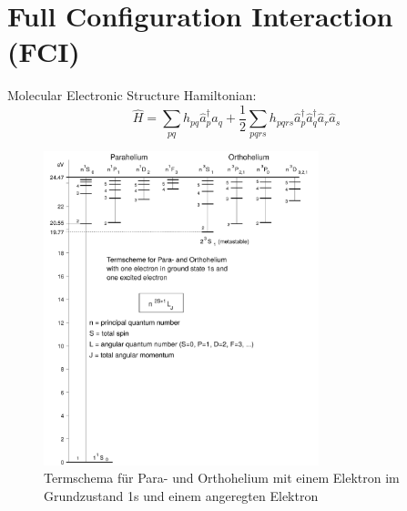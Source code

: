 \documentclass[9pt]{report}
\begin{document}
\section{Full Configuration Interaction (FCI)}

Molecular Electronic Structure Hamiltonian:
\begin{equation}
\hat{H}=\sum_{pq}h_{pq}\hat{a}_{p}^{\dagger}\hat{a}_{q}+\frac{1}{2}\sum_{pqrs}h_{pqrs}\hat{a}_{p}^{\dagger}\hat{a}_{q}^{\dagger}\hat{a}_{r}\hat{a}_{s}
\end{equation}


\begin{figure}[H]
	\centering
	\includegraphics[width=8cm]{Helium-term-scheme.pdf}
	\caption{Termschema für Para- und Orthohelium mit einem Elektron im Grundzustand 1s und einem angeregten Elektron}
\end{figure}
\end{document}

